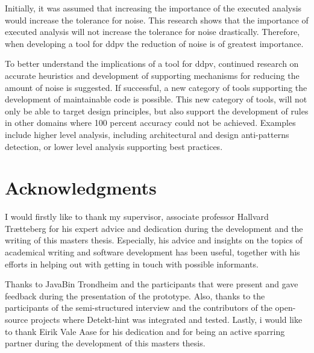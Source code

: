 \documentclass{report}
\begin{document}
Initially, it was assumed that increasing the importance of the executed analysis would increase the tolerance for noise. This research shows that the importance of executed analysis will not increase the tolerance for noise drastically. Therefore, when developing a tool for \gls{ddpv} the reduction of noise is of greatest importance. 

To better understand the implications of a tool for \gls{ddpv}, continued research on accurate heuristics and development of supporting mechanisms for reducing the amount of noise is suggested. If successful, a new category of tools supporting the development of maintainable code is possible. This new category of tools, will not only be able to target design principles, but also support the development of rules in other domains where 100 percent accuracy could not be achieved. Examples include higher level analysis, including architectural and design anti-patterns detection, or lower level analysis supporting best practices.

\section{Acknowledgments}
\label{acknowledgements}
I would firstly like to thank my supervisor, associate professor Hallvard Trætteberg for his expert advice and dedication during the development and the writing of this masters thesis. Especially, his advice and insights on the topics of academical writing and software development has been useful, together with his efforts in helping out with getting in touch with possible informants.

Thanks to JavaBin Trondheim and the participants that were present and gave feedback during the presentation of the prototype. Also, thanks to the participants of the semi-structured interview and the contributors of the open-source projects where Detekt-hint was integrated and tested. Lastly, i would like to thank Eirik Vale Aase for his dedication and for being an active sparring partner during the development of this masters thesis.

\printbibliography

\appendix
\label{appendix}

\end{document}
